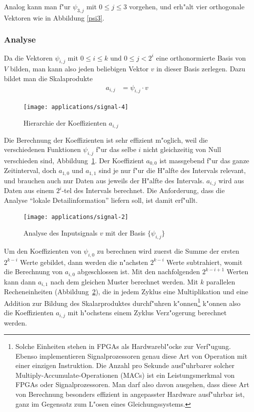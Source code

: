 Analog kann man f"ur $\psi_{3,j}$ mit $0\le j\le 3$ vorgehen, und
erh"alt vier orthogonale Vektoren wie in Abbildung \ref{psi3}.

\subsubsection{Analyse}
Da die Vektoren $\psi_{i,j}$ mit $0\le i\le k$ und
$0\le j< 2^i$ eine orthonormierte Basis von $V$ bilden, man kann also
jeden beliebigen Vektor $v$ in dieser Basis zerlegen.
Dazu bildet man die Skalaprodukte
\begin{align*}
a_{i,j}&=\psi_{i,j}\cdot v
\end{align*}
\begin{figure}
\begin{center}
\texttt{[image: applications/signal-4]}
\end{center}
\caption{Hierarchie der Koeffizienten $a_{i,j}$\label{coefhierarchy}}
\end{figure}
Die Berechnung der Koeffizienten ist sehr effizient m"oglich, weil die
verschiedenen Funktionen $\psi_{i,j}$ f"ur das selbe $i$ nicht gleichzeitig
von Null verschieden sind, Abbildung~\ref{coefhierarchy}.
Der Koeffizient $a_{0,0}$ ist massgebend f"ur das ganze Zeitinterval,
doch $a_{1,0}$ und $a_{1,1}$ sind je nur f"ur die H"alfte des Intervals
relevant, und brauchen auch nur Daten aus jeweils der H"alfte
des Intervals. $a_{i,j}$ wird aus Daten aus einem $2^i$-tel des
Intervals berechnet.
Die Anforderung, dass die Analyse ``lokale Detailinformation''
liefern soll, ist damit erf"ullt.

\begin{figure}
\begin{center}
\texttt{[image: applications/signal-2]}
\end{center}
\caption{Analyse des Inputsignals $v$ mit der Basis $\{\psi_{i,j}\}$
\label{waveletanalysis}}
\end{figure}
Um den Koeffizienten von $\psi_{i,0}$ zu berechnen wird zuerst
die Summe der ersten $2^{k-i}$ Werte gebildet, dann werden die
n"achsten $2^{k-i}$ Werte subtrahiert, womit die Berechnung von $a_{i,0}$
abgeschlossen ist. Mit den nachfolgenden $2^{k-i+1}$ Werten kann dann
$a_{i,1}$ nach dem gleichen Muster berechnet werden. Mit $k$ parallelen
Recheneinheiten (Abbildung~\ref{waveletanalysis}),
die in jedem Zyklus eine Multiplikation und eine Addition zur
Bildung des Skalarproduktes durchf"uhren k"onnen\footnote{Solche 
Einheiten stehen in FPGAs als Hardwarebl"ocke zur Verf"ugung. Ebenso
implementieren Signalprozessoren genau diese Art von Operation
mit einer einzigen Instruktion.
Die Anzahl pro Sekunde ausf"uhrbarer solcher
Multiply-Accumulate-Operationen (MACs)
ist ein Leistungsmerkmal von FPGAs oder Signalprozessoren.
Man darf also davon ausgehen,
dass diese Art von Berechnung besonders effizient in angepasster
Hardware ausf"uhrbar ist, ganz im Gegensatz zum L"osen eines
Gleichungssystems.}
k"onnen also die Koeffizienten $a_{i,j}$ mit h"ochstens
einem Zyklus Verz"ogerung berechnet werden.

